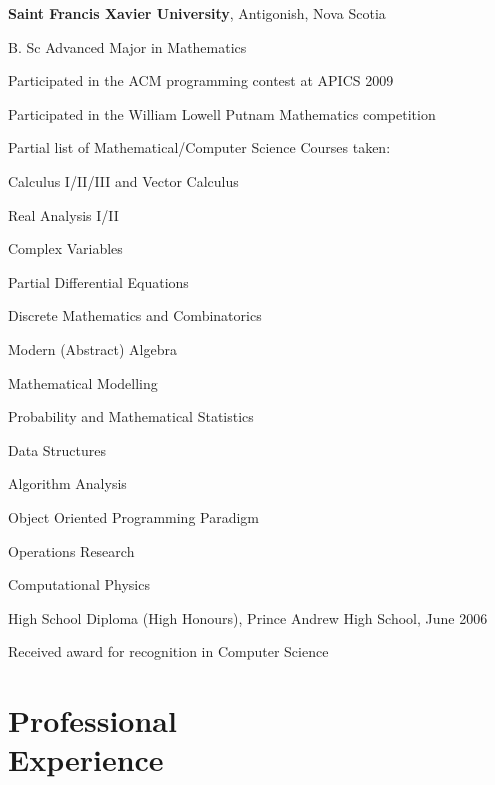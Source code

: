\documentclass[margin,line]{resume}
\begin{document}
\begin{resume}
	{\bf Saint Francis Xavier University}, Antigonish, Nova Scotia \vspace{2mm}%
	\begin{list1}
		\item[] B. Sc Advanced Major in Mathematics
		\begin{list2}
			\vspace*{1mm}
			\item Participated in the ACM programming contest at APICS 2009
			\item Participated in the William Lowell Putnam Mathematics competition
		\end{list2}
		\item[] Partial list of Mathematical/Computer Science Courses taken:
		\begin{list2}
			\vspace*{1mm}
			\item Calculus I/II/III and Vector Calculus
			\item Real Analysis I/II
			\item Complex Variables
			\item Partial Differential Equations
			\item Discrete Mathematics and Combinatorics
			\item Modern (Abstract) Algebra
			\item Mathematical Modelling
			\item Probability and Mathematical Statistics
			\item Data Structures
			\item Algorithm Analysis
			\item Object Oriented Programming Paradigm
			\item Operations Research
			\item Computational Physics
		\end{list2}
		\vspace*{2mm}
		\item[] High School Diploma (High Honours), Prince Andrew High School, June 2006
		\begin{list2}
			\vspace*{1mm}
			\item Received award for recognition in Computer Science
		\end{list2}
	\end{list1}

	\section{\mysidestyle Professional\\Experience}


\end{resume}
\end{document}
